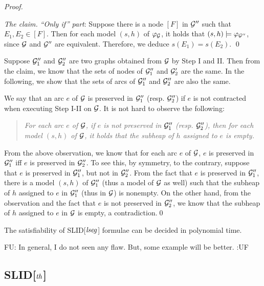 \documentclass{llncs}
\newcommand{\fu}[1]{\color{purple} {FU: #1 :UF} \color{black}}
\begin{document}
\begin{proof}
\begin{proof}[The claim]
{\it ``Only if'' part}: Suppose there is a node $[F]$ in $\mathcal{G}''$ such that $E_1,E_2 \in [F]$. Then for each model $(s,h)$ of $\varphi_{\mathcal{G}}$, it holds that $(s,h) \models \varphi_{\mathcal{G}''}$, since $\mathcal{G}$ and $\mathcal{G}''$ are equivalent. Therefore, we deduce $s(E_1)=s(E_2)$. \qed
\end{proof}

Suppose $\mathcal{G}''_1$ and $\mathcal{G}''_2$ are two graphs obtained from $\mathcal{G}$ by Step I and II. Then from the claim, we know that the sets of nodes of $\mathcal{G}''_1$ and $\mathcal{G}'_2$ are the same. In the following, we show that the sets of arcs of $\mathcal{G}''_1$ and $\mathcal{G}''_2$ are also the same.

We say that an arc $e$ of $\mathcal{G}$ is preserved in $\mathcal{G}''_1$ (resp. $\mathcal{G}''_2$) if $e$ is not contracted when executing Step I-II on $\mathcal{G}$. It is not hard to observe the following:
\begin{quote}
\it For each arc $e$ of $\mathcal{G}$, if $e$ is not preserved in $\mathcal{G}''_1$ (resp. $\mathcal{G}''_2$), then for each model $(s,h)$ of $\mathcal{G}$, it holds that the subheap of $h$ assigned to $e$ is empty.
\end{quote}

From the above observation, we know that for each arc $e$ of $\mathcal{G}$, $e$ is preserved in $\mathcal{G}''_1$ iff $e$ is preserved in $\mathcal{G}''_2$. To see this, by symmetry, to the contrary, suppose that $e$ is preserved in $\mathcal{G}''_1$, but not in $\mathcal{G}''_2$. From the fact that $e$ is preserved in $\mathcal{G}''_1$, there is a model $(s,h)$ of $\mathcal{G}''_1$ (thus a model of $\mathcal{G}$ as well) such that the subheap of $h$ assigned to $e$ in $\mathcal{G}''_1$ (thus in $\mathcal{G}$) is nonempty. On the other hand, from the observation and the fact that $e$ is not preserved in $\mathcal{G}''_2$, we know that the subheap of $h$ assigned to $e$ in $\mathcal{G}$ is empty, a contradiction.\qed
%
%
\end{proof}

\begin{theorem}
The satisfiability of SLID[$\mathit{lseg}$] formulae can be decided in polynomial time.
\end{theorem}

\fu{In general, I do not seen any flaw. But, some example will be better.}


\subsection{SLID[$\mathit{th}$]}
\end{document}
